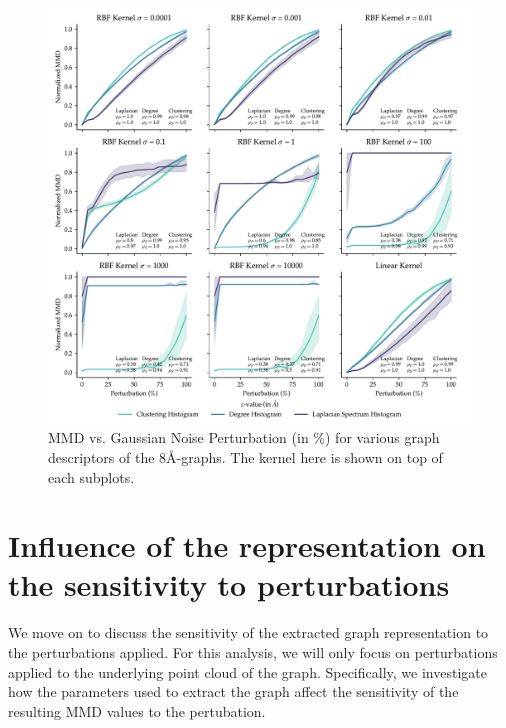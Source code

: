 \begin{figure}
  \centering
  \includegraphics[width=\textwidth]{./figures/results/res_1_2.pdf}
  \caption{MMD vs. Gaussian Noise Perturbation (in \%) for various graph descriptors of the
    8\si{\angstrom}-graphs. The kernel here is shown on top of each subplots.}
  \label{fig:mmd_effect_kernel}
\end{figure}



\section{Influence of the representation on the sensitivity to perturbations}

We move on to discuss the sensitivity of the extracted graph representation to
the perturbations applied. For this analysis, we will only focus on
perturbations applied to the underlying point cloud of the graph. Specifically,
we investigate how the parameters used to extract the graph affect the
sensitivity of the resulting MMD values to the pertubation.

